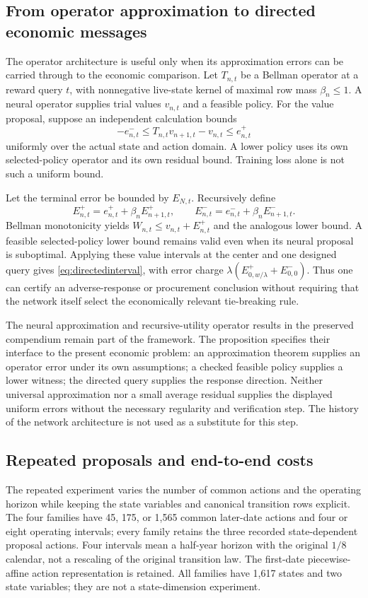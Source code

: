 \subsection{From operator approximation to directed economic messages}
\label{sec:operatorbridge}
The operator architecture is useful only when its approximation errors can be carried through to the economic comparison. Let $T_{n,t}$ be a Bellman operator at a reward query $t$, with nonnegative live-state kernel of maximal row mass $\beta_n\leq1$. A neural operator supplies trial values $v_{n,t}$ and a feasible policy. For the value proposal, suppose an independent calculation bounds
\[
 -e^-_{n,t}\leq T_{n,t}v_{n+1,t}-v_{n,t}\leq e^+_{n,t}
\]
uniformly over the actual state and action domain. A lower policy uses its own selected-policy operator and its own residual bound. Training loss alone is not such a uniform bound.

\begin{proposition}
\label{prop:operatorresponse}
Let the terminal error be bounded by $E_{N,t}$. Recursively define
\[
 E^+_{n,t}=e^+_{n,t}+\beta_nE^+_{n+1,t},\qquad
 E^-_{n,t}=e^-_{n,t}+\beta_nE^-_{n+1,t}.
\]
Bellman monotonicity yields $W_{n,t}\leq v_{n,t}+E^+_{n,t}$ and the analogous lower bound. A feasible selected-policy lower bound remains valid even when its neural proposal is suboptimal. Applying these value intervals at the center and one designed query gives \eqref{eq:directedinterval}, with error charge
$\lambda(E^+_{0,w/\lambda}+E^-_{0,0})$.
Thus one can certify an adverse-response or procurement conclusion without requiring that the network itself select the economically relevant tie-breaking rule.
\end{proposition}

The neural approximation and recursive-utility operator results in the preserved compendium remain part of the framework. The proposition specifies their interface to the present economic problem: an approximation theorem supplies an operator error under its own assumptions; a checked feasible policy supplies a lower witness; the directed query supplies the response direction. Neither universal approximation nor a small average residual supplies the displayed uniform errors without the necessary regularity and verification step. The history of the network architecture is not used as a substitute for this step.

\subsection{Repeated proposals and end-to-end costs}
\label{sec:newcomputations}
The repeated experiment varies the number of common actions and the operating horizon while keeping the state variables and canonical transition rows explicit. The four families have 45, 175, or 1,565 common later-date actions and four or eight operating intervals; every family retains the three recorded state-dependent proposal actions. Four intervals mean a half-year horizon with the original $1/8$ calendar, not a rescaling of the original transition law. The first-date piecewise-affine action representation is retained. All families have 1,617 states and two state variables; they are not a state-dimension experiment.

